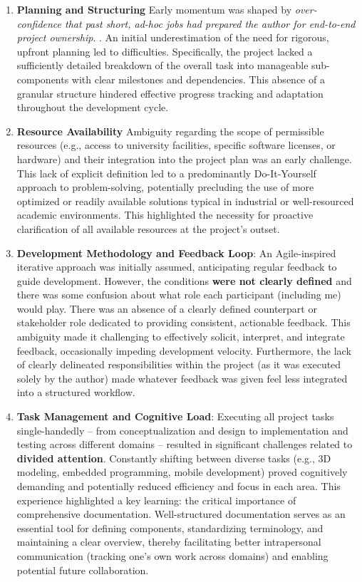 \begin{enumerate}
	\item \textbf{Planning and Structuring} Early momentum was shaped by \textit{over-confidence that past short, ad-hoc jobs had prepared the author for end-to-end project ownership}. . An initial underestimation of the need for rigorous, upfront planning led to difficulties. Specifically, the project lacked a sufficiently detailed breakdown of the overall task into manageable sub-components with clear milestones and dependencies. This absence of a granular structure hindered effective progress tracking and adaptation throughout the development cycle.
	\item \textbf{Resource Availability} Ambiguity regarding the scope of permissible resources (e.g., access to university facilities, specific software licenses, or hardware) and their integration into the project plan was an early challenge. This lack of explicit definition led to a predominantly Do-It-Yourself approach to problem-solving, potentially precluding the use of more optimized or readily available solutions typical in industrial or well-resourced academic environments. This highlighted the necessity for proactive clarification of all available resources at the project's outset.
	\item \textbf{Development Methodology and Feedback Loop}: An Agile-inspired iterative approach was initially assumed, anticipating regular feedback to guide development. However, the conditions \textbf{were not clearly defined} and there was some confusion about what role each participant (including me) would play. There was an absence of a clearly defined counterpart or stakeholder role dedicated to providing consistent, actionable feedback. This ambiguity made it challenging to effectively solicit, interpret, and integrate feedback, occasionally impeding development velocity. Furthermore, the lack of clearly delineated responsibilities within the project (as it was executed solely by the author) made whatever feedback was given feel less integrated into a structured workflow. 
	\item \textbf{Task Management and Cognitive Load}: Executing all project tasks single-handedly – from conceptualization and design to implementation and testing across different domains – resulted in significant challenges related to \textbf{divided attention}. Constantly shifting between diverse tasks (e.g., 3D modeling, embedded programming, mobile development) proved cognitively demanding and potentially reduced efficiency and focus in each area. This experience highlighted a key learning: the critical importance of comprehensive documentation. Well-structured documentation serves as an essential tool for defining components, standardizing terminology, and maintaining a clear overview, thereby facilitating better intrapersonal communication (tracking one's own work across domains) and enabling potential future collaboration.
\end{enumerate}

